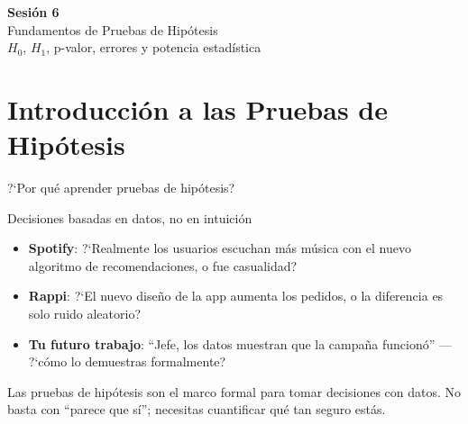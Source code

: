 \documentclass[aspectratio=169, 11pt]{beamer}
\begin{document}
\begin{frame}{}
\vfill
\centering
{\Large\textbf{Sesi\'on 6}}\\[1em]
{\normalsize Fundamentos de Pruebas de Hip\'otesis}\\[0.5em]
{\small $H_0$, $H_1$, p-valor, errores y potencia estad\'istica}
\vfill
\end{frame}

\section{Introducción a las Pruebas de Hipótesis}

\begin{frame}{?`Por qu\'e aprender pruebas de hip\'otesis?}
\small
\begin{exampleblock}{Decisiones basadas en datos, no en intuici\'on}
\begin{itemize}\setlength{\itemsep}{2pt}
  \item \textbf{Spotify}: ?`Realmente los usuarios escuchan m\'as m\'usica con el nuevo algoritmo de recomendaciones, o fue casualidad?
  \item \textbf{Rappi}: ?`El nuevo dise\~no de la app aumenta los pedidos, o la diferencia es solo ruido aleatorio?
  \item \textbf{Tu futuro trabajo}: ``Jefe, los datos muestran que la campa\~na funcion\'o'' --- ?`c\'omo lo demuestras formalmente?
\end{itemize}
\end{exampleblock}

\vspace{0.2cm}
Las pruebas de hip\'otesis son el marco formal para tomar \alert{decisiones} con datos. No basta con ``parece que s\'i''; necesitas cuantificar qu\'e tan seguro est\'as.
\end{frame}
\end{document}
